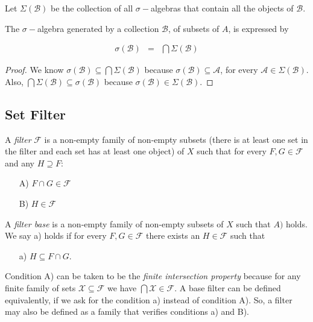 \documentclass [12pt]{book}
\begin{document}
Let $\Sigma(\mathcal{B})$ be the collection of all $\sigma-$algebras that contain all the objects of $\mathcal{B}$.

\begin{proposition}The $\sigma-$algebra generated by a collection $\mathcal{B}$, of subsets of $A$, is expressed by

\begin{eqnarray}\nonumber\sigma(\mathcal{B})&=&\bigcap\Sigma(\mathcal{B})
\end{eqnarray}\end{proposition}

\begin{proof}We know $\sigma(\mathcal{B})\subseteq\bigcap\Sigma(\mathcal{B})$ because $\sigma(\mathcal{B})\subseteq\mathcal{A}$, for every $\mathcal{A}\in\Sigma(\mathcal{B})$. Also, $\bigcap\Sigma(\mathcal{B})\subseteq\sigma(\mathcal{B})$ because $\sigma(\mathcal{B})\in\Sigma(\mathcal{B})$.\end{proof}

		\subsection{Set Filter}


A \textit{filter} $\mathcal{F}$ is a non-empty family of non-empty subsets (there is at least one set in the filter and each set has at least one object) of $X$ such that for every $F,G\in\mathcal{F}$ and any $H\supseteq F$:

\begin{itemize}\item[A)]$F\cap G\in\mathcal{F}$\item[B)] $H\in\mathcal{F}$\end{itemize}

A \textit{filter base} is a non-empty family of non-empty subsets of $X$ such that $A)$ holds. We say a) holds if for every $F,G\in\mathcal{F}$ there exists an $H\in\mathcal{F}$ such that

\begin{itemize}\item[a)]$H\subseteq F\cap G$.\end{itemize}

Condition A) can be taken to be the \textit{finite intersection property} because for any finite family of sets $\mathcal X\subseteq\mathcal F$ we have $\bigcap\mathcal X\in\mathcal F$. A base filter can be defined equivalently, if we ask for the condition a) instead of condition A). So, a filter may also be defined as a family that verifies conditions a) and B). 
\end{document}
